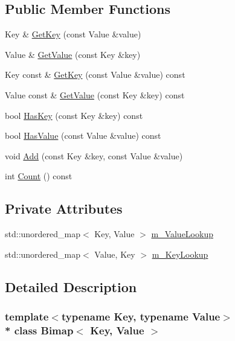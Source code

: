 \subsection*{Public Member Functions}
\begin{DoxyCompactItemize}
\item 
Key \& \hyperlink{class_bimap_a287bee82ecf52e0addf01188e845b3b4}{Get\+Key} (const Value \&value)
\item 
Value \& \hyperlink{class_bimap_a38d190f4016ae28f415014ef4e6c08da}{Get\+Value} (const Key \&key)
\item 
Key const \& \hyperlink{class_bimap_a36a74e2ba009c5bc72dc3175db626395}{Get\+Key} (const Value \&value) const 
\item 
Value const \& \hyperlink{class_bimap_a094513ddbc939755ea3c26afa26c3975}{Get\+Value} (const Key \&key) const 
\item 
bool \hyperlink{class_bimap_acb0e0a0d4e926680f047edd90ee15f7b}{Has\+Key} (const Key \&key) const 
\item 
bool \hyperlink{class_bimap_a6aa7600cc5324041ba977670d85bbe4c}{Has\+Value} (const Value \&value) const 
\item 
void \hyperlink{class_bimap_a6c80d80555ca8318ee53845d83a81628}{Add} (const Key \&key, const Value \&value)
\item 
int \hyperlink{class_bimap_aef1a42d79e8c66d5453b655dc17ccc07}{Count} () const 
\end{DoxyCompactItemize}
\subsection*{Private Attributes}
\begin{DoxyCompactItemize}
\item 
std\+::unordered\+\_\+map$<$ Key, Value $>$ \hyperlink{class_bimap_ae27127063317d62ce8b44281e0804bb6}{m\+\_\+\+Value\+Lookup}
\item 
std\+::unordered\+\_\+map$<$ Value, Key $>$ \hyperlink{class_bimap_acc45f88d39f38379f4caf7a776b53f96}{m\+\_\+\+Key\+Lookup}
\end{DoxyCompactItemize}


\subsection{Detailed Description}
\subsubsection*{template$<$typename Key, typename Value$>$\\*
class Bimap$<$ Key, Value $>$}



